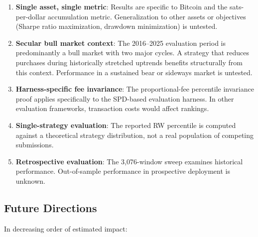 \documentclass[11pt,letterpaper]{article}
\begin{document}
\begin{enumerate}
  \item \textbf{Single asset, single metric}: Results are specific to Bitcoin and
    the sats-per-dollar accumulation metric.  Generalization to other assets or
    objectives (Sharpe ratio maximization, drawdown minimization) is untested.

  \item \textbf{Secular bull market context}: The 2016--2025 evaluation period is
    predominantly a bull market with two major cycles.  A strategy that reduces
    purchases during historically stretched uptrends benefits structurally from
    this context.  Performance in a sustained bear or sideways market is
    untested.

  \item \textbf{Harness-specific fee invariance}: The proportional-fee
    percentile invariance proof applies specifically to the SPD-based evaluation
    harness.  In other evaluation frameworks, transaction costs would affect
    rankings.

  \item \textbf{Single-strategy evaluation}: The reported RW percentile is
    computed against a theoretical strategy distribution, not a real population
    of competing submissions.

  \item \textbf{Retrospective evaluation}: The 3,076-window sweep examines
    historical performance.  Out-of-sample performance in prospective deployment
    is unknown.
\end{enumerate}

\subsection{Future Directions}

In decreasing order of estimated impact:
\end{document}
